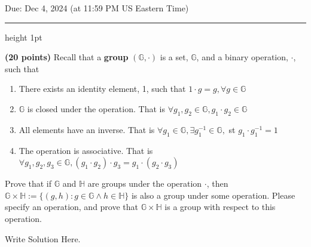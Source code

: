 \documentclass[12pt]{hw}
\begin{document}
\maketitle

\begin{center} Due: Dec 4, 2024 (at 11:59 PM US Eastern Time) \\[10pt]
  \hrule height 1pt
\end{center}

\toggletrue{answers}

\setcounter{MaxMatrixCols}{20} \setlength\parindent{0pt}







\begin{exercise}
\textbf{(20 points)}
Recall that a \textbf{group} $(\mathbb{G},\cdot)$ is a set, $\mathbb{G}$, and a binary operation, $\cdot$, such that
\begin{enumerate}
    \item There exists an identity element, 1, such that $1 \cdot g = g, \forall g \in \mathbb{G}$ 
    \item $\mathbb{G}$ is closed under the operation. That is $\forall g_1,g_2 \in \mathbb{G}, g_1 \cdot g_2 \in \mathbb{G}$
    \item All elements have an inverse. That is $\forall g_1 \in \mathbb{G}, \exists g_1^{-1} \in \mathbb{G},$ st $ g_1 \cdot g_1^{-1} = 1 $
     \item The operation is associative. That is $\forall g_1, g_2, g_3 \in \mathbb{G}, (g_1 \cdot g_2) \cdot g_3 = g_1 \cdot (g_2 \cdot g_3)$
\end{enumerate}

Prove that if $\mathbb{G}$ and $\mathbb{H}$ are groups under the operation $\cdot$, then $\mathbb{G} \times \mathbb{H}:=\{(g,h): g \in \mathbb{G} \wedge h \in \mathbb{H} \} $ is also a group under some operation.
Please specify an operation, and prove that $\mathbb{G} \times \mathbb{H}$ is a group with respect to this operation. 
\end{exercise}

\begin{answer}
  Write Solution Here.
\end{answer}
\end{document}
